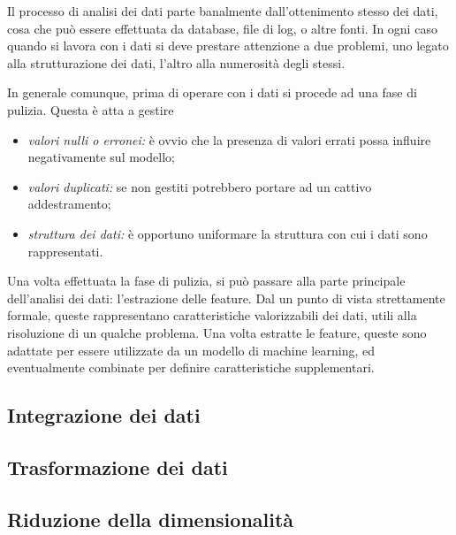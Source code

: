 \documentclass{subfiles}
\begin{document}
Il processo di analisi dei dati parte banalmente dall'ottenimento stesso dei dati,
cosa che può essere effettuata da database, file di log, o altre fonti.
In ogni caso quando si lavora con i dati si deve prestare attenzione a due problemi,
uno legato alla strutturazione dei dati, l'altro alla numerosità degli stessi.

In generale comunque, prima di operare con i dati si procede ad una fase di pulizia.
Questa è atta a gestire
\begin{itemize}
    \item \emph{valori nulli o erronei:} è ovvio che la presenza di valori errati possa influire negativamente sul modello;
    \item \emph{valori duplicati:} se non gestiti potrebbero portare ad un cattivo addestramento;
    \item \emph{struttura dei dati:} è opportuno uniformare la struttura con cui i dati sono rappresentati.
\end{itemize}

Una volta effettuata la fase di pulizia, si può passare alla parte principale dell'analisi dei dati: l'estrazione delle feature.
Dal un punto di vista strettamente formale, queste rappresentano caratteristiche valorizzabili dei dati,
utili alla risoluzione di un qualche problema. Una volta estratte le feature, queste sono adattate per essere utilizzate da un modello di machine learning,
ed eventualmente combinate per definire caratteristiche supplementari.

\subsection{Integrazione dei dati}


\subsection{Trasformazione dei dati}


\subsection{Riduzione della dimensionalità}

\clearpage
\end{document}
